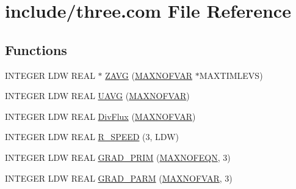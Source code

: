 \hypertarget{home_2abonfi_2_c_f_d__codes_2_eul_f_s_83_84_2include_2three_8com}{\section{include/three.com File Reference}
\label{home_2abonfi_2_c_f_d__codes_2_eul_f_s_83_84_2include_2three_8com}
}
\subsection*{Functions}
\begin{DoxyCompactItemize}
\item 
I\-N\-T\-E\-G\-E\-R L\-D\-W R\-E\-A\-L $\ast$ \hyperlink{home_2abonfi_2_c_f_d__codes_2_eul_f_s_83_84_2include_2three_8com_a63efc6c7080809fef3845bb143f55d41}{Z\-A\-V\-G} (\hyperlink{msa20_2home_2abonfi_2_c_f_d__codes_2_eul_f_s_83_82_83_2include_2paramt_8h_ae08fa28f58a75033834af08d1f9359ce}{M\-A\-X\-N\-O\-F\-V\-A\-R} $\ast$M\-A\-X\-T\-I\-M\-L\-E\-V\-S)
\item 
I\-N\-T\-E\-G\-E\-R L\-D\-W R\-E\-A\-L \hyperlink{home_2abonfi_2_c_f_d__codes_2_eul_f_s_83_84_2include_2three_8com_ad59e2d047908ce4ed3fc820d45a326fb}{U\-A\-V\-G} (\hyperlink{msa20_2home_2abonfi_2_c_f_d__codes_2_eul_f_s_83_82_83_2include_2paramt_8h_ae08fa28f58a75033834af08d1f9359ce}{M\-A\-X\-N\-O\-F\-V\-A\-R})
\item 
I\-N\-T\-E\-G\-E\-R L\-D\-W R\-E\-A\-L \hyperlink{home_2abonfi_2_c_f_d__codes_2_eul_f_s_83_84_2include_2three_8com_a540efd196c8ba8ffacd2054d7cd37c3d}{Div\-Flux} (\hyperlink{msa20_2home_2abonfi_2_c_f_d__codes_2_eul_f_s_83_82_83_2include_2paramt_8h_ae08fa28f58a75033834af08d1f9359ce}{M\-A\-X\-N\-O\-F\-V\-A\-R})
\item 
I\-N\-T\-E\-G\-E\-R L\-D\-W R\-E\-A\-L \hyperlink{home_2abonfi_2_c_f_d__codes_2_eul_f_s_83_84_2include_2three_8com_ab9b65ce69bcdbe659e8abbf2992e665d}{R\-\_\-\-S\-P\-E\-E\-D} (3, L\-D\-W)
\item 
I\-N\-T\-E\-G\-E\-R L\-D\-W R\-E\-A\-L \hyperlink{home_2abonfi_2_c_f_d__codes_2_eul_f_s_83_84_2include_2three_8com_a92eab26680b58f9932bafdd58c32b8e2}{G\-R\-A\-D\-\_\-\-P\-R\-I\-M} (\hyperlink{msa20_2home_2abonfi_2_c_f_d__codes_2_eul_f_s_83_82_83_2include_2paramt_8h_a1cc2b3e0df194e3b8ad34f033bf6547c}{M\-A\-X\-N\-O\-F\-E\-Q\-N}, 3)
\item 
I\-N\-T\-E\-G\-E\-R L\-D\-W R\-E\-A\-L \hyperlink{home_2abonfi_2_c_f_d__codes_2_eul_f_s_83_84_2include_2three_8com_a0716486ee6cba1f79eb140111cd27fbe}{G\-R\-A\-D\-\_\-\-P\-A\-R\-M} (\hyperlink{msa20_2home_2abonfi_2_c_f_d__codes_2_eul_f_s_83_82_83_2include_2paramt_8h_ae08fa28f58a75033834af08d1f9359ce}{M\-A\-X\-N\-O\-F\-V\-A\-R}, 3)

\end{DoxyCompactItemize}
